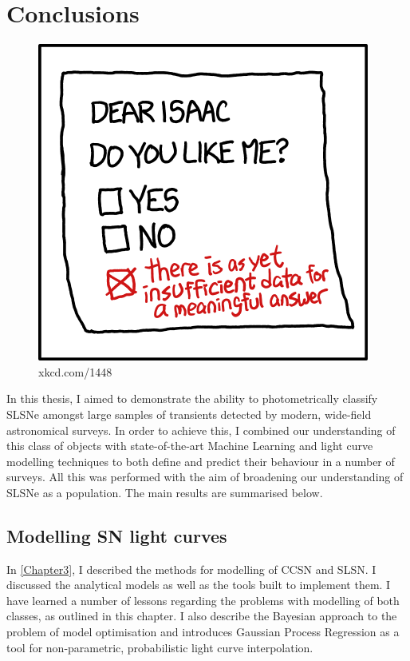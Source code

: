 \chapter{Conclusions}
\label{Chapter6}

\begin{figure}[H]
  \centering
  \includegraphics{Figures/xkcd/chapter6.png}
  \caption*{xkcd.com/1448}
\end{figure}

In this thesis, I aimed to demonstrate the ability to photometrically classify SLSNe amongst large samples of transients detected by modern, wide-field astronomical surveys. In order to achieve this, I combined our understanding of this class of objects with state-of-the-art Machine Learning and light curve modelling techniques to both define and predict their behaviour in a number of surveys. All this was performed with the aim of broadening our understanding of SLSNe as a population. The main results are summarised below.

\section{Modelling SN light curves}
In \cref{Chapter3}, I described the methods for modelling of CCSN and SLSN. I discussed the analytical models as well as the tools built to implement them. I have learned a number of lessons regarding the problems with modelling of both classes, as outlined in this chapter. I also describe the Bayesian approach to the problem of model optimisation and introduces Gaussian Process Regression as a tool for non-parametric, probabilistic light curve interpolation.

